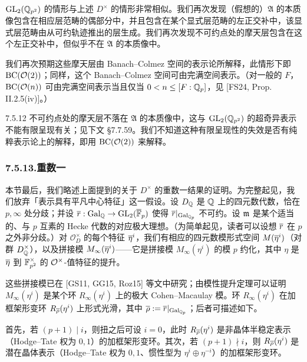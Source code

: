 $\mathrm{GL}_2(\mathbb{Q}_{p^2})$ 的情形与上述 $D^\times$ 的情形非常相似。我们再次发现（假想的）$\mathfrak A$ 的本质像包含在相应层范畴的偶部分中，并且包含在某个显式层范畴的左正交补中，该显式层范畴由从可约轨迹推出的层生成。我们再次发现不可约点处的摩天层包含在这个左正交补中，但似乎不在 $\mathfrak A$ 的本质像中。

我们再次预期这些摩天层由 Banach--Colmez 空间的表示论所解释，此情形下即 $\mathrm{BC}(\mathcal{O}(2))$；同样，这个 Banach--Colmez 空间可由完满空间表示。（对一般的 $F$，$\mathrm{BC}(\mathcal{O}(n))$ 可由完满空间表示当且仅当 $0<n\le[F:\mathbb{Q}_p]$，见 [FS24, Prop. II.2.5(iv)]。）

\begin{rem}{7.5.12}\label{thm:a4-7-5-12}
不可约点处的摩天层不落在 $\mathfrak A$ 的本质像中，这与 $\mathrm{GL}_2(\mathbb{Q}_{p^2})$ 的超奇异表示不能有限呈现有关；见下文 §7.7.59。我们不知道这种有限呈现性的失效是否有纯粹表示论上的解释，即用 $\mathrm{BC}(\mathcal{O}(2))$ 来解释。
\end{rem}

\subsubsection*{7.5.13.\quad 重数一}
本节最后，我们略述上面提到的关于 $D^\times$ 的重数一结果的证明。为完整起见，我们放弃「表示具有平凡中心特征」这一假设。设 $D_{\mathbb{Q}}$ 是 $\mathbb{Q}$ 上的四元数代数，恰在 $p,\infty$ 处分歧；并设 $\overline{r}:\operatorname{Gal}_{\mathbb{Q}}\to\mathrm{GL}_2(\overline{\mathbb{F}}_p)$ 使得 $\overline{r}|_{\operatorname{Gal}_{\mathbb{Q}_p}}$ 不可约。设 $\mathfrak{m}$ 是某个适当的、与 $p$ 互素的 Hecke 代数的对应极大理想。（为简单起见，读者可以设想 $\overline{r}$ 在 $p$ 之外非分歧。）对 $\mathcal O_D^\times$ 的每个特征 $\overline{\eta}^{i}$，我们有相应的四元数模形式空间 $M(\overline{\eta}^{i})$（对群 $D_{\mathbb{Q}}^\times$），以及拼接模 $M_\infty(\overline{\eta}^{i})$——它是拼接模 $M_\infty(\eta^{i})$ 的模 $p$ 约化，其中 $\eta$ 是 $\overline{\eta}$ 到 $\mathbb{F}_{p^2}^\times$ 的 $\mathcal{O}^\times$-值特征的提升。

这些拼接模已在 [GS11, GG15, Roz15] 等文中研究；由模性提升定理可以证明 $M_\infty(\eta^{i})$ 是某个环 $R_\infty(\eta^{i})$ 上的极大 Cohen--Macaulay 模。环 $R_\infty(\eta^{i})$ 在加框架形变环 $R_{\overline{\rho}}(\eta^{i})$ 上形式光滑，其中 $\overline{\rho}:=\overline{r}|_{\operatorname{Gal}_{\mathbb{Q}_p}}$；后者可描述如下。

首先，若 $(p+1)\mid i$，则扭之后可设 $i=0$，此时 $R_{\overline{\rho}}(\eta^{i})$ 是非晶体半稳定表示（Hodge--Tate 权为 $0,1$）的加框架形变环。其次，若 $(p+1)\nmid i$，则 $R_{\overline{\rho}}(\eta^{i})$ 是潜在晶体表示（Hodge--Tate 权为 $0,1$、惯性型为 $\eta^{i}\oplus\eta^{-i}$）的加框架形变环。

